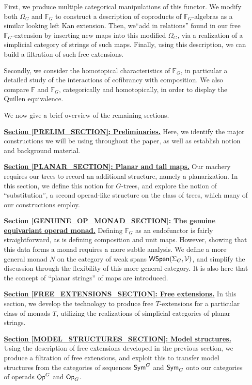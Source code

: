 \documentclass[a4paper,10pt]{article}%
\begin{document}
First, we produce multiple categorical manipulations of this functor. We modify both $\Omega_G$ and $\mathbb F_G$ to construct a description of coproducts of $\mathbb F_G$-algebras as a similar looking left Kan extension. Then, we``add in relations'' found in our free $\mathbb F_G$-extension by inserting new maps into this modified $\Omega_G$, via a realization of a simplicial category of strings of such maps. Finally, using this description, we can build a filtration of such free extensions.

Secondly, we consider the homotopical characteristics of $\mathbb F_G$, in particular a detailed study of the interactions of cofibrancy with composition. We also compare $\mathbb F$ and $\mathbb F_G$, categorically and homotopically, in order to display the Quillen equivalence.

We now give a brief overview of the remaining sections.

\textbf{\hyperref[PRELIM_SECTION]{Section \ref{PRELIM_SECTION}: Preliminaries.}} Here, we identify the major constructions we will be using throughout the paper, as well as establish notion and background material.

\textbf{\hyperref[PLANAR_SECTION]{Section \ref{PLANAR_SECTION}: Planar and tall maps.}} Our machery requires our trees to record an additional structure, namely a planarization. In this section, we define this notion for $G$-trees, and explore the notion of ``substitution'', a second operad-like structure on the class of trees, which many of our constructions employ.

\textbf{\hyperref[GENUINE_OP_MONAD_SECTION]{Section \ref{GENUINE_OP_MONAD_SECTION}: The genuine equivariant operad monad.}} Defining $\mathbb F_G$ as an endofunctor is fairly straightforward, as is defining composition and unit maps. However, showing that this data forms a monad requires a more subtle analysis. We define a more general monad $N$ on the category of weak spans $\mathsf{WSpan}(\Sigma_G, \mathcal V)$, and simplify the discussion through the flexibility of this more general category. It is also here that the concept of ``planar strings'' of maps are introduced.

\textbf{\hyperref[FREE_EXTENSIONS_SECTION]{Section \ref{FREE_EXTENSIONS_SECTION}: Free extensions.}} In this section, we develop the technology to produce free $T$-extensions for a particular class of monads $T$, utilizing the realizations of simplicial categories of planar strings.

\textbf{\hyperref[MODEL_STRUCTURES_SECTION]{Section \ref{MODEL_STRUCTURES_SECTION}: Model structures.}} Using the description of free extensions developed in the previous section, we produce a filtration of free extensions, and exploit this to transfer model structures from the categories of sequences $\mathsf{Sym}^G$ and $\mathsf{Sym}_G$ onto our categories of operads $\mathsf{Op}^G$ and $\mathsf{Op}_G$.
\end{document}

